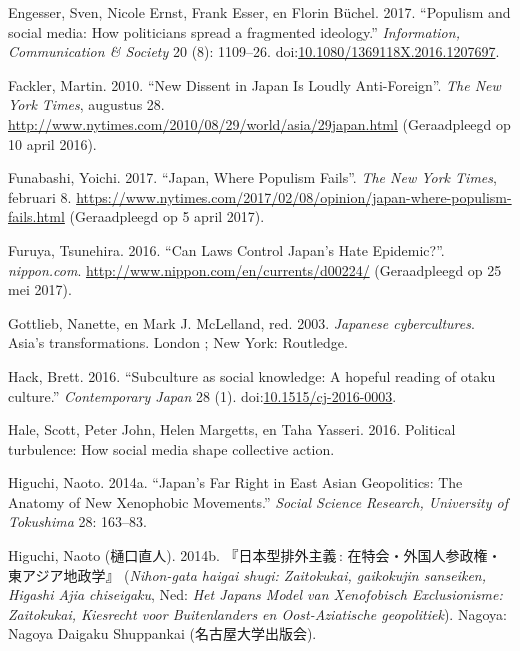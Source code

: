 \documentclass[10.5pt,dutch,]{article}
\begin{document}
\hypertarget{ref-engesserux5fpopulismux5f2017}{}
Engesser, Sven, Nicole Ernst, Frank Esser, en Florin Büchel. 2017.
“Populism and social media: How politicians spread a fragmented ideology.”  
\emph{Information, Communication \& Society} 20 (8): 1109--26.
doi:\href{https://doi.org/10.1080/1369118X.2016.1207697}{10.1080/1369118X.2016.1207697}.

\hypertarget{ref-facklerux5fnewux5f2010}{}
Fackler, Martin. 2010. “New Dissent in Japan Is Loudly Anti-Foreign”.  \emph{The New York Times}, augustus 28. \url{http://www.nytimes.com/2010/08/29/world/asia/29japan.html} (Geraadpleegd op 10 april 2016).

\hypertarget{ref-funabashiux5fjapanux5f2017}{}
Funabashi, Yoichi. 2017. “Japan, Where Populism Fails”.  \emph{The New York Times}, februari 8. \url{https://www.nytimes.com/2017/02/08/opinion/japan-where-populism-fails.html} (Geraadpleegd op 5 april 2017).

\hypertarget{ref-furuyaux5fcanux5f2016}{}
Furuya, Tsunehira. 2016. “Can Laws Control Japan’s Hate Epidemic?”.  \emph{nippon.com}. \url{http://www.nippon.com/en/currents/d00224/} (Geraadpleegd op 25 mei 2017).

\hypertarget{ref-gottliebux5fjapaneseux5f2003}{}
Gottlieb, Nanette, en Mark J. McLelland, red. 2003. \emph{Japanese
cybercultures}. Asia's transformations. London ; New York: Routledge.

\hypertarget{ref-hackux5fsubcultureux5f2016}{}
Hack, Brett. 2016. “Subculture as social knowledge: A hopeful reading of
otaku culture.”  \emph{Contemporary Japan} 28 (1).
doi:\href{https://doi.org/10.1515/cj-2016-0003}{10.1515/cj-2016-0003}.

\hypertarget{ref-haleux5fpoliticalux5f2016}{}
Hale, Scott, Peter John, Helen Margetts, en Taha Yasseri. 2016.
Political turbulence: How social media shape collective action.

\hypertarget{ref-higuchiux5fjapansux5f2014}{}
Higuchi, Naoto. 2014a. “Japan's Far Right in East Asian Geopolitics: The
Anatomy of New Xenophobic Movements.”  \emph{Social Science Research,
University of Tokushima} 28: 163--83.

\hypertarget{ref-higuchiux5fned:ux5f2014}{}
Higuchi, Naoto (樋口直人). 2014b. 『日本型排外主義 : 在特会・外国人参政権・東アジア地政学』 (\emph{Nihon-gata haigai shugi: Zaitokukai, gaikokujin sanseiken, Higashi Ajia chiseigaku}, Ned: \emph{Het Japans Model van Xenofobisch Exclusionisme: Zaitokukai, Kiesrecht voor Buitenlanders en Oost-Aziatische geopolitiek}). Nagoya: Nagoya Daigaku Shuppankai (名古屋大学出版会).
\end{document}
